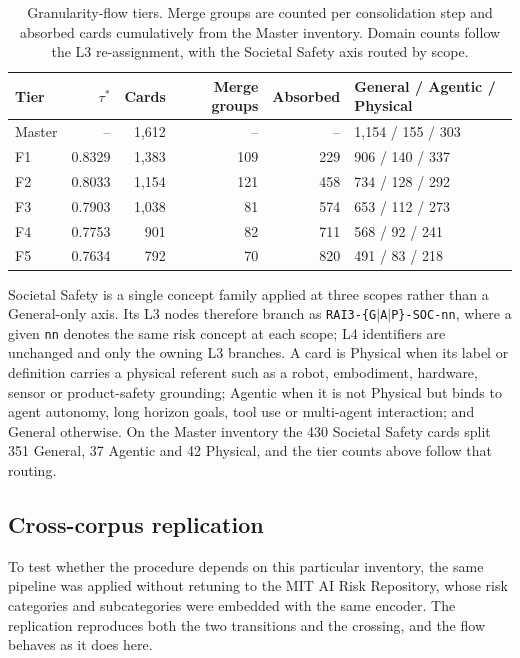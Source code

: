 \documentclass[11pt,a4paper]{article}
\begin{document}
\begin{table}[H]
\centering
\caption{Granularity-flow tiers. Merge groups are counted per consolidation step
and absorbed cards cumulatively from the Master inventory. Domain counts follow
the L3 re-assignment, with the Societal Safety axis routed by scope.}
\label{tab:ftiers}
\small
\begin{tabularx}{\linewidth}{lrrrrY}
\toprule
Tier & $\tau^{*}$ & Cards & Merge groups & Absorbed & General / Agentic / Physical \\
\midrule
Master & --     & 1,612 & --  & --  & 1,154 / 155 / 303 \\
F1     & 0.8329 & 1,383 & 109 & 229 & 906 / 140 / 337 \\
F2     & 0.8033 & 1,154 & 121 & 458 & 734 / 128 / 292 \\
F3     & 0.7903 & 1,038 & 81  & 574 & 653 / 112 / 273 \\
F4     & 0.7753 & 901   & 82  & 711 & 568 / 92 / 241 \\
F5     & 0.7634 & 792   & 70  & 820 & 491 / 83 / 218 \\
\bottomrule
\end{tabularx}
\end{table}

Societal Safety is a single concept family applied at three scopes rather than a
General-only axis. Its L3 nodes therefore branch as
\texttt{RAI3-\{G$\vert$A$\vert$P\}-SOC-nn}, where a given \texttt{nn} denotes the
same risk concept at each scope; L4 identifiers are unchanged and only the owning
L3 branches. A card is Physical when its label or definition carries a physical
referent such as a robot, embodiment, hardware, sensor or product-safety
grounding; Agentic when it is not Physical but binds to agent autonomy, long
horizon goals, tool use or multi-agent interaction; and General otherwise. On the
Master inventory the 430 Societal Safety cards split 351 General, 37 Agentic and
42 Physical, and the tier counts above follow that routing.

\subsection{Cross-corpus replication}

To test whether the procedure depends on this particular inventory, the same
pipeline was applied without retuning to the MIT AI Risk Repository, whose risk
categories and subcategories were embedded with the same encoder. The
replication reproduces both the two transitions and the crossing, and the flow
behaves as it does here.
\end{document}
